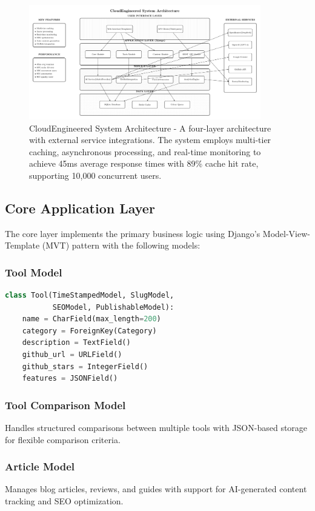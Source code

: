 \documentclass[conference]{IEEEtran}
\begin{document}
\begin{figure}[t]
\centerline{\includegraphics[width=0.9\textwidth]{architecture_diagram.png}}
\caption{CloudEngineered System Architecture - A four-layer architecture with external service integrations. The system employs multi-tier caching, asynchronous processing, and real-time monitoring to achieve 45ms average response times with 89\% cache hit rate, supporting 10,000 concurrent users.}
\label{fig:architecture}
\end{figure}

\subsection{Core Application Layer}

The core layer implements the primary business logic using Django's Model-View-Template (MVT) pattern with the following models:

\subsubsection{Tool Model}
\begin{lstlisting}[language=Python, basicstyle=\small\ttfamily]
class Tool(TimeStampedModel, SlugModel, 
           SEOModel, PublishableModel):
    name = CharField(max_length=200)
    category = ForeignKey(Category)
    description = TextField()
    github_url = URLField()
    github_stars = IntegerField()
    features = JSONField()
\end{lstlisting}

\subsubsection{Tool Comparison Model}
Handles structured comparisons between multiple tools with JSON-based storage for flexible comparison criteria.

\subsubsection{Article Model}
Manages blog articles, reviews, and guides with support for AI-generated content tracking and SEO optimization.
\end{document}
